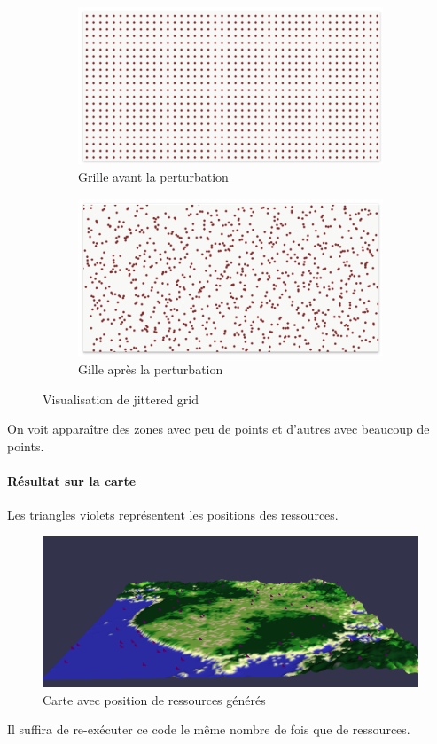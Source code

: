 \begin{figure}[!h]
    \centering
    \begin{subfigure}{0.4\linewidth}
        \centeringimage
        \includegraphics[width=\linewidth]{images/grille.png}
        \caption{Grille avant la perturbation}
        \label{fig:image_avant_expansion}
    \end{subfigure}
    \hfill
    \begin{subfigure}{0.4\linewidth}
        \centering
        \includegraphics[width=\linewidth]{images/jitter.png}
        \caption{Gille après la perturbation}
        \label{fig:histo_avant_expansion}
    \end{subfigure}
    \caption{Visualisation de jittered grid}
\end{figure}

On voit apparaître des zones avec peu de points et d'autres avec beaucoup de points.

\paragraph{Résultat sur la carte}
Les triangles violets représentent les positions des ressources.
\begin{figure}[!h]
    \centering
    \includegraphics[width=0.5\linewidth]{images/mapjitter.png}
    \caption{Carte avec position de ressources générés}
    \label{fig:enter-label}
\end{figure}

Il suffira de re-exécuter ce code le même nombre de fois que de ressources.